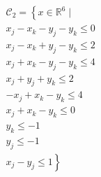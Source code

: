 \documentclass[runningheads]{llncs}
\begin{document}
\begin{equation*}
\begin{aligned}
     &\mathcal{C}_{2}=\left\{x\in \mathbb{R}^{6}\mid \right. \\
                    &x_{j}-x_{k}-y_{j}-y_{k} \leq 0 \\
                    &x_{j}-x_{k}+y_{j}-y_{k} \leq 2 \\
                    &x_{j}+x_{k}-y_{j}-y_{k} \leq 4\\ 
                    &x_{j}+y_{j}+y_{k} \leq 2\\ 
                    &-x_{j}+x_{k}-y_{k} \leq 4\\ 
                    &x_{j}+x_{k}-y_{k} \leq 0\\ 
                    &y_{k} \leq -1\\ 
                    &y_{j} \leq -1\\ 
                    &x_{j}-y_{j} \leq 1\left.\right\}
	\end{aligned}
\end{equation*}
\end{document}
